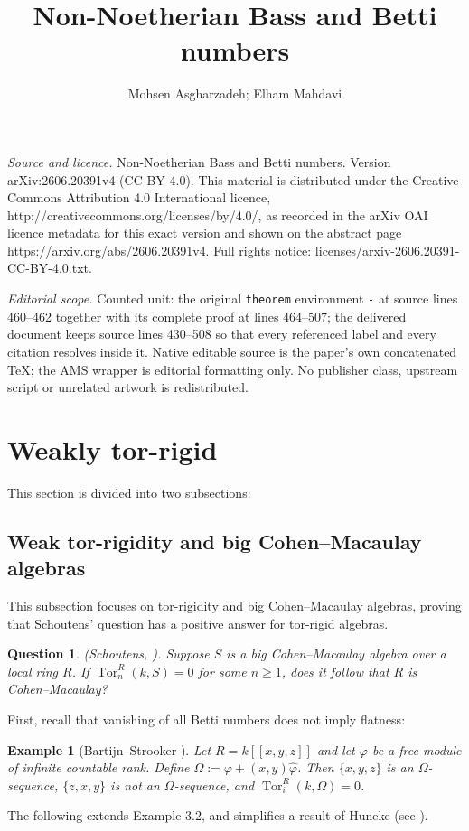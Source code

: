 \documentclass[10pt,a4paper]{amsart}
\numberwithin{equation}{section}
\newtheorem{example}[theorem]{Example}
\newtheorem{question}[theorem]{Question}\newtheorem{discussion}[theorem]{Discussion}
\begin{document}
\title[Non-Noetherian Bass and Betti numbers]{Non-Noetherian Bass and Betti numbers}
\author{Mohsen Asgharzadeh; Elham Mahdavi}
\date{}
\maketitle
\noindent\emph{Source and licence.} Non-Noetherian Bass and Betti numbers. Version arXiv:2606.20391v4 (CC BY 4.0). This material is distributed under the Creative Commons Attribution 4.0 International licence, http://creativecommons.org/licenses/by/4.0/, as recorded in the arXiv OAI licence metadata for this exact version and shown on the abstract page https://arxiv.org/abs/2606.20391v4. Full rights notice: licenses/arxiv-2606.20391-CC-BY-4.0.txt.\par\smallskip
\noindent\textit{Editorial scope.} Counted unit: the original \texttt{theorem} environment \texttt{-} at source lines 460--462 together with its complete proof at lines 464--507; the delivered document keeps source lines 430--508 so that every referenced label and every citation resolves inside it. Native editable source is the paper's own concatenated TeX; the AMS wrapper is editorial formatting only. No publisher class, upstream script or unrelated artwork is redistributed.
	\section{Weakly tor-rigid}
This section is divided into two subsections:
	\subsection{Weak tor-rigidity and big Cohen--Macaulay algebras}
	
	This subsection focuses on tor-rigidity and big Cohen--Macaulay algebras, proving that Schoutens' question has a positive answer for tor-rigid algebras.
	
\begin{question}(Schoutens, \cite[End of \S 2]{sc1}).
	Suppose \(S\) is a big Cohen--Macaulay algebra over a local ring \(R\). If \(\operatorname{Tor}_n^R(k,S)=0\) for some \(n\ge 1\), does it follow that \(R\) is Cohen--Macaulay?
\end{question}First, recall that vanishing of all Betti numbers does not imply flatness:
\begin{example}[Bartijn--Strooker \cite{BS}]
	Let \(R = k[[x,y,z]]\) and let \(\varphi\) be a free module of infinite countable rank. Define \(\Omega := \varphi + (x,y)\widehat{\varphi}\). Then \(\{x,y,z\}\) is an \(\Omega\)-sequence, \(\{z,x,y\}\) is not an \(\Omega\)-sequence, and \(\operatorname{Tor}_i^R(k,\Omega)=0\).  
\end{example}
The following extends Example 3.2, and simplifies a result of Huneke (see \cite[9.1]{Hun}).
\end{document}
